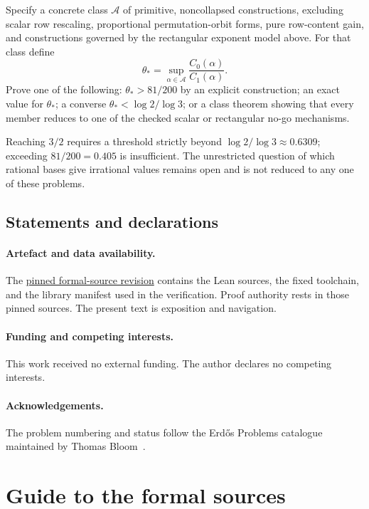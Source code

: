\documentclass[11pt]{article}
\begin{document}
\begin{problem}
Specify a concrete class $\mathcal A$ of primitive, noncollapsed constructions,
excluding scalar row rescaling, proportional permutation-orbit forms, pure
row-content gain, and constructions governed by the rectangular exponent model
above.  For that class define
\[
 \theta_*=\sup_{\alpha\in\mathcal A}
   \frac{C_0(\alpha)}{C_1(\alpha)}.
\]
Prove one of the following: $\theta_*>81/200$ by an explicit construction;
an exact value for $\theta_*$; a converse
$\theta_*<\log2/\log3$; or a class theorem showing that every member reduces to
one of the checked scalar or rectangular no-go mechanisms.
\end{problem}

Reaching $3/2$ requires a threshold strictly beyond
$\log2/\log3\approx0.6309$; exceeding $81/200=0.405$ is insufficient.
The unrestricted question of which rational bases give irrational values
remains open and is not reduced to any one of these problems.

\subsection*{Statements and declarations}

\paragraph{Artefact and data availability.} The
\href{\sourceurl}{pinned formal-source revision} contains the Lean sources, the
fixed toolchain, and the library manifest used in the verification.  Proof
authority rests in those pinned sources.  The present text is exposition and
navigation.

\paragraph{Funding and competing interests.} This work received no external
funding.  The author declares no competing interests.

\paragraph{Acknowledgements.} The problem numbering and status follow the
Erd\H{o}s Problems catalogue maintained by Thomas Bloom~\cite{erdosproblems}.

\appendix
\section{Guide to the formal sources}\label{long1049:app:index}
\end{document}
